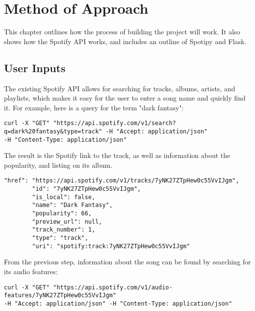 %
%
%
\chapter{Method of Approach} \label{ch:method}
This chapter outlines how the process of building the project will work. It also
shows how the Spotify API works, and includes an outline of Spotipy and Flask.

\section{User Inputs}

The existing Spotify API allows for searching for tracks, albums, artists, and playlists, which
makes it easy for the user to enter a song name and quickly find it. For example, here is a query
for the term "dark fantasy":
\\

\lstset{language=Java}
\begin{lstlisting}
curl -X "GET" "https://api.spotify.com/v1/search?q=dark%20fantasy&type=track" -H "Accept: application/json"
-H "Content-Type: application/json"
\end{lstlisting}

The result is the Spotify link to the track, as well as information about the popularity,
and listing on its album.\\

\begin{lstlisting}
"href": "https://api.spotify.com/v1/tracks/7yNK27ZTpHew0c55VvIJgm",
        "id": "7yNK27ZTpHew0c55VvIJgm",
        "is_local": false,
        "name": "Dark Fantasy",
        "popularity": 66,
        "preview_url": null,
        "track_number": 1,
        "type": "track",
        "uri": "spotify:track:7yNK27ZTpHew0c55VvIJgm"
\end{lstlisting}

From the previous step, information about the song can be found by searching for its audio features:
\\
\begin{lstlisting}
curl -X "GET" "https://api.spotify.com/v1/audio-features/7yNK27ZTpHew0c55VvIJgm"
-H "Accept: application/json" -H "Content-Type: application/json"
\end{lstlisting}


